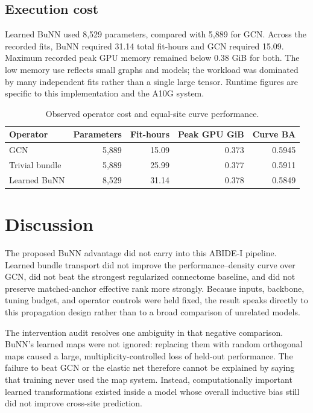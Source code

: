 \documentclass[11pt,a4paper]{article}
\begin{document}
\subsection{Execution cost}

Learned BuNN used 8,529 parameters, compared with 5,889 for GCN. Across the
recorded fits, BuNN required 31.14 total fit-hours and GCN required 15.09.
Maximum recorded peak GPU memory remained below 0.38 GiB for both. The low
memory use reflects small graphs and models; the workload was dominated by
many independent fits rather than a single large tensor. Runtime figures are
specific to this implementation and the A10G system.

\begin{table}[htbp]
\centering
\caption{Observed operator cost and equal-site curve performance.}
\label{tab:efficiency}
\small
\begin{tabularx}{\textwidth}{@{}Y r r r r@{}}
\toprule
\textbf{Operator} & \textbf{Parameters} & \textbf{Fit-hours} & \textbf{Peak GPU GiB} & \textbf{Curve BA} \\
\midrule
GCN & 5,889 & 15.09 & 0.373 & 0.5945 \\
Trivial bundle & 5,889 & 25.99 & 0.377 & 0.5911 \\
Learned BuNN & 8,529 & 31.14 & 0.378 & 0.5849 \\
\bottomrule
\end{tabularx}
\end{table}

\section{Discussion}

The proposed BuNN advantage did not carry into this ABIDE-I pipeline. Learned
bundle transport did not improve the performance--density curve over GCN,
did not beat the strongest regularized connectome baseline, and did not
preserve matched-anchor effective rank more strongly. Because inputs,
backbone, tuning budget, and operator controls were held fixed, the result
speaks directly to this propagation design rather than to a broad comparison
of unrelated models.

The intervention audit resolves one ambiguity in that negative comparison.
BuNN's learned maps were not ignored: replacing them with random orthogonal
maps caused a large, multiplicity-controlled loss of held-out performance.
The failure to beat GCN or the elastic net therefore cannot be explained by
saying that training never used the map system. Instead, computationally
important learned transformations existed inside a model whose overall
inductive bias still did not improve cross-site prediction.
\end{document}
